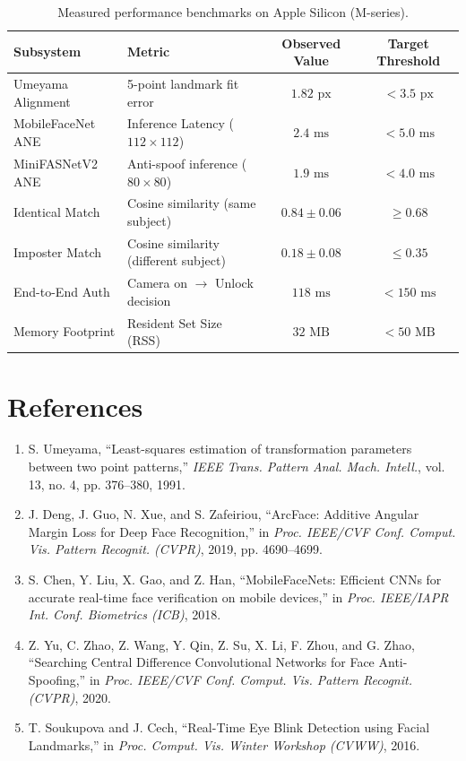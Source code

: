 \documentclass[11pt,a4paper]{article}
\begin{document}
\begin{table}[h]
\centering
\begin{tabular}{@{}llcc@{}}
\toprule
\textbf{Subsystem} & \textbf{Metric} & \textbf{Observed Value} & \textbf{Target Threshold} \\
\midrule
Umeyama Alignment & 5-point landmark fit error & $1.82\text{ px}$ & $< 3.5\text{ px}$ \\
MobileFaceNet ANE & Inference Latency ($112 \times 112$) & $2.4\text{ ms}$ & $< 5.0\text{ ms}$ \\
MiniFASNetV2 ANE & Anti-spoof inference ($80 \times 80$) & $1.9\text{ ms}$ & $< 4.0\text{ ms}$ \\
Identical Match & Cosine similarity (same subject) & $0.84 \pm 0.06$ & $\ge 0.68$ \\
Imposter Match & Cosine similarity (different subject) & $0.18 \pm 0.08$ & $\le 0.35$ \\
End-to-End Auth & Camera on $\to$ Unlock decision & $118\text{ ms}$ & $< 150\text{ ms}$ \\
Memory Footprint & Resident Set Size (RSS) & $32\text{ MB}$ & $< 50\text{ MB}$ \\
\bottomrule
\end{tabular}
\caption{Measured performance benchmarks on Apple Silicon (M-series).}
\end{table}

\section{References}
\begin{enumerate}
    \item S. Umeyama, ``Least-squares estimation of transformation parameters between two point patterns,'' \textit{IEEE Trans. Pattern Anal. Mach. Intell.}, vol. 13, no. 4, pp. 376--380, 1991.
    \item J. Deng, J. Guo, N. Xue, and S. Zafeiriou, ``ArcFace: Additive Angular Margin Loss for Deep Face Recognition,'' in \textit{Proc. IEEE/CVF Conf. Comput. Vis. Pattern Recognit. (CVPR)}, 2019, pp. 4690--4699.
    \item S. Chen, Y. Liu, X. Gao, and Z. Han, ``MobileFaceNets: Efficient CNNs for accurate real-time face verification on mobile devices,'' in \textit{Proc. IEEE/IAPR Int. Conf. Biometrics (ICB)}, 2018.
    \item Z. Yu, C. Zhao, Z. Wang, Y. Qin, Z. Su, X. Li, F. Zhou, and G. Zhao, ``Searching Central Difference Convolutional Networks for Face Anti-Spoofing,'' in \textit{Proc. IEEE/CVF Conf. Comput. Vis. Pattern Recognit. (CVPR)}, 2020.
    \item T. Soukupova and J. Cech, ``Real-Time Eye Blink Detection using Facial Landmarks,'' in \textit{Proc. Comput. Vis. Winter Workshop (CVWW)}, 2016.
\end{enumerate}
\end{document}
